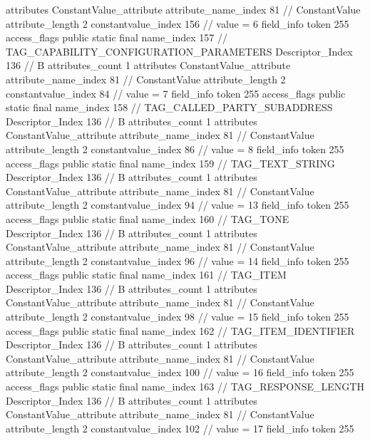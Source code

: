 {{{{{				attributes {
				ConstantValue_attribute {
					attribute_name_index	81		// ConstantValue
					attribute_length	2
					constantvalue_index	156		// value = 6
				}
				}
			}
			field_info {
				token	255
				access_flags	public static final
				name_index	157		// TAG_CAPABILITY_CONFIGURATION_PARAMETERS
				Descriptor_Index	136		// B
				attributes_count	1
				attributes {
				ConstantValue_attribute {
					attribute_name_index	81		// ConstantValue
					attribute_length	2
					constantvalue_index	84		// value = 7
				}
				}
			}
			field_info {
				token	255
				access_flags	public static final
				name_index	158		// TAG_CALLED_PARTY_SUBADDRESS
				Descriptor_Index	136		// B
				attributes_count	1
				attributes {
				ConstantValue_attribute {
					attribute_name_index	81		// ConstantValue
					attribute_length	2
					constantvalue_index	86		// value = 8
				}
				}
			}
			field_info {
				token	255
				access_flags	public static final
				name_index	159		// TAG_TEXT_STRING
				Descriptor_Index	136		// B
				attributes_count	1
				attributes {
				ConstantValue_attribute {
					attribute_name_index	81		// ConstantValue
					attribute_length	2
					constantvalue_index	94		// value = 13
				}
				}
			}
			field_info {
				token	255
				access_flags	public static final
				name_index	160		// TAG_TONE
				Descriptor_Index	136		// B
				attributes_count	1
				attributes {
				ConstantValue_attribute {
					attribute_name_index	81		// ConstantValue
					attribute_length	2
					constantvalue_index	96		// value = 14
				}
				}
			}
			field_info {
				token	255
				access_flags	public static final
				name_index	161		// TAG_ITEM
				Descriptor_Index	136		// B
				attributes_count	1
				attributes {
				ConstantValue_attribute {
					attribute_name_index	81		// ConstantValue
					attribute_length	2
					constantvalue_index	98		// value = 15
				}
				}
			}
			field_info {
				token	255
				access_flags	public static final
				name_index	162		// TAG_ITEM_IDENTIFIER
				Descriptor_Index	136		// B
				attributes_count	1
				attributes {
				ConstantValue_attribute {
					attribute_name_index	81		// ConstantValue
					attribute_length	2
					constantvalue_index	100		// value = 16
				}
				}
			}
			field_info {
				token	255
				access_flags	public static final
				name_index	163		// TAG_RESPONSE_LENGTH
				Descriptor_Index	136		// B
				attributes_count	1
				attributes {
				ConstantValue_attribute {
					attribute_name_index	81		// ConstantValue
					attribute_length	2
					constantvalue_index	102		// value = 17
				}
				}
			}
			field_info {
				token	255
}}}}}

